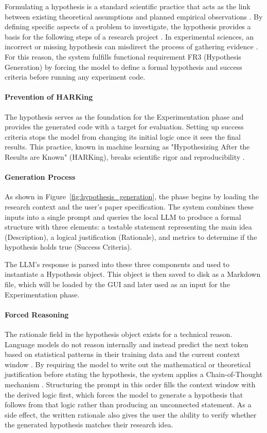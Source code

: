 Formulating a hypothesis is a standard scientific practice that acts as the link between existing theoretical assumptions and planned empirical observations \cite{Bunge1967}. 
By defining specific aspects of a problem to investigate, the hypothesis provides a basis for the following steps of a research project \cite{Farrugia2010}. 
In experimental sciences, an incorrect or missing hypothesis can misdirect the process of gathering evidence \cite{Farrugia2010}. 
For this reason, the system fulfills functional requirement FR3 (Hypothesis Generation) by forcing the model to define a formal hypothesis and success criteria before running any experiment code. 

\paragraph{Prevention of HARKing}
The hypothesis serves as the foundation for the Experimentation phase and provides the generated code with a target for evaluation. 
Setting up success criteria stops the model from changing its initial logic once it sees the final results. 
This practice, known in machine learning as "Hypothesizing After the Results are Known" (HARKing), breaks scientific rigor and reproducibility \cite{Gencoglu2019}.

\paragraph{Generation Process}
As shown in Figure~\ref{fig:hypothesis_generation}, the phase begins by loading the research context and the user's paper specification.
The system combines these inputs into a single prompt and queries the local LLM to produce a formal structure with three elements:
a testable statement representing the main idea (Description), a logical justification (Rationale), and metrics to determine if the hypothesis holds true (Success Criteria).

The LLM's response is parsed into these three components and used to instantiate a Hypothesis object.
This object is then saved to disk as a Markdown file, which will be loaded by the GUI and later used as an input for the Experimentation phase.

\paragraph{Forced Reasoning}
The rationale field in the hypothesis object exists for a technical reason.
Language models do not reason internally and instead predict the next token based on statistical patterns in their training data and the current context window \cite{Bender2021}.
By requiring the model to write out the mathematical or theoretical justification before stating the hypothesis, the system applies a Chain-of-Thought mechanism \cite{Wei2022}.
Structuring the prompt in this order fills the context window with the derived logic first, which forces the model to generate a hypothesis that follows from that logic rather than producing an unconnected statement.
As a side effect, the written rationale also gives the user the ability to verify whether the generated hypothesis matches their research idea.

